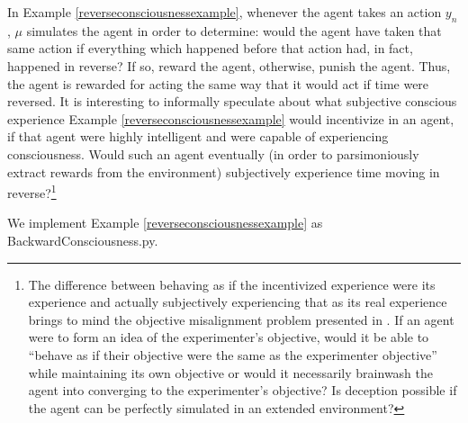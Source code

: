 \documentclass{article}
\begin{document}
In Example \ref{reverseconsciousnessexample}, whenever the agent takes an action $y_n$,
$\mu$ simulates the agent in order to determine: would the agent have taken that same
action if everything which happened before that action had, in fact, happened in reverse?
If so, reward the agent, otherwise, punish the agent.
Thus, the agent is rewarded for acting the same way that it would act if time were
reversed. It is interesting to informally speculate about what subjective conscious
experience Example \ref{reverseconsciousnessexample} would incentivize in an agent,
if that agent were highly intelligent and were capable of experiencing consciousness.
Would such an agent eventually (in order to parsimoniously extract rewards from the
environment) subjectively experience time moving in reverse?\footnote{The
difference between behaving as if
the incentivized experience were its experience and actually subjectively
experiencing that as its real experience brings to mind the objective misalignment
problem presented in \cite{hubinger2019risks}. If an agent were to form an
idea of the experimenter's objective, would it be able to ``behave as if
their objective were the same as the experimenter objective'' while maintaining its own
objective or would it necessarily brainwash the agent into converging to the
experimenter's objective? Is deception possible if the agent can be perfectly
simulated in an extended environment?}

We implement Example \ref{reverseconsciousnessexample} as BackwardConsciousness.py.
\end{document}
